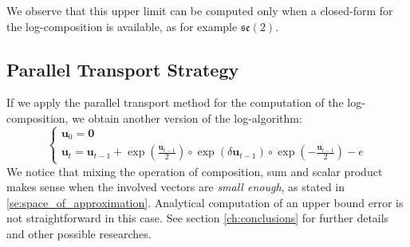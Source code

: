We observe that this upper limit can be computed only when a closed-form for the log-composition is available, as for example $\mathfrak{se}(2)$.

\subsection{Parallel Transport Strategy}

If we apply the parallel transport method for the computation of the log-composition, we obtain another version of the log-algorithm:
\begin{equation}\label{eq:bossa_parallel_strategy}
\begin{cases}
\mathbf{u}_0 = \mathbf{0} \\
\mathbf{u}_{t} = \mathbf{u}_{t-1} + \exp(\frac{\mathbf{u}_{t-1}}{2}) \circ \exp(\delta \mathbf{u}_{t-1}) \circ \exp(-\frac{\mathbf{u}_{t-1}}{2}) - e
\end{cases}
\end{equation}
We notice that mixing the operation of composition, sum and scalar product makes sense when the involved vectors are \emph{small enough}, as stated in \ref{se:space_of_approximation}. 
Analytical computation of an upper bound error is not straightforward in this case. See section \ref{ch:conclusions} for further details and other possible researches.


